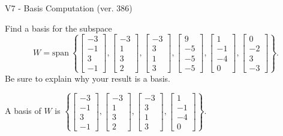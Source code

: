 \begin{exercise}
  \begin{exerciseTitle}V7 - Basis Computation (ver. 386)\end{exerciseTitle}
  \begin{exerciseStatement}
    Find a basis for the subspace 
\[W=\mathrm{span}\ \left\{\left[\begin{array}{r}
-3 \\
-1 \\
3 \\
-1
\end{array}\right] , \left[\begin{array}{r}
-3 \\
1 \\
3 \\
2
\end{array}\right] , \left[\begin{array}{r}
-3 \\
3 \\
1 \\
3
\end{array}\right] , \left[\begin{array}{r}
9 \\
-5 \\
-5 \\
-5
\end{array}\right] , \left[\begin{array}{r}
1 \\
-1 \\
-4 \\
0
\end{array}\right] , \left[\begin{array}{r}
0 \\
-2 \\
3 \\
-3
\end{array}\right]\right\}.\]
 Be sure to explain why your result is a basis.


  \end{exerciseStatement}
  \begin{exerciseAnswer}
   A basis of \(W\) is  \(\left\{\left[\begin{array}{r}
-3 \\
-1 \\
3 \\
-1
\end{array}\right] , \left[\begin{array}{r}
-3 \\
1 \\
3 \\
2
\end{array}\right] , \left[\begin{array}{r}
-3 \\
3 \\
1 \\
3
\end{array}\right] , \left[\begin{array}{r}
1 \\
-1 \\
-4 \\
0
\end{array}\right]\right\}\).
  


  \end{exerciseAnswer}
\end{exercise}